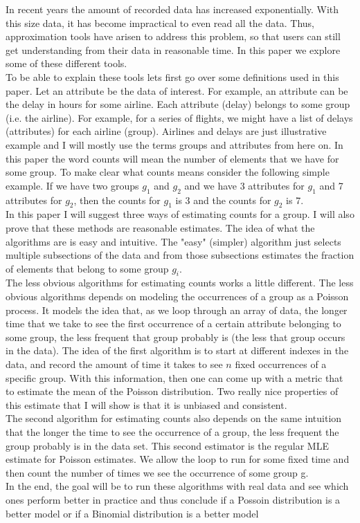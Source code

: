 \documentclass[a4paper]{article}
\begin{document}
In recent years the amount of recorded data has increased exponentially.
With this size data, it has become impractical to even read all the data.
Thus, approximation tools have arisen to address this problem, so that users can still get understanding from their data in reasonable time.
In this paper we explore some of these different tools.\\
\indent To be able to explain these tools lets first go over some definitions used in this paper.
Let an attribute be the data of interest.
For example, an attribute can be the delay in hours for some airline.
Each attribute (delay) belongs to some group (i.e. the airline).
For example, for a series of flights, we might have a list of delays (attributes) for each airline (group).
Airlines and delays are just illustrative example and
I will mostly use the terms groups and attributes from here on.
In this paper the word counts will mean the number of elements that we have for some group.
To make clear what counts means consider the following simple example.
If we have two groups $g_1$ and $g_2$ and we have 3 attributes for $g_1$ and 7 attributes for $g_2$, then the counts for $g_1$ is 3 and the counts for $g_2$ is 7.\\
\indent In this paper I will suggest three ways of estimating counts for a group.
I will also prove that these methods are reasonable estimates.
The idea of what the algorithms are is easy and intuitive.
The "easy" (simpler) algorithm just selects multiple subsections of the data and from those subsections estimates the fraction of elements that belong to some group $g_i$. \\
\indent The less obvious algorithms for estimating counts works a little different.
The less obvious algorithms depends on modeling the occurrences of a group as a Poisson process.
It models the idea that, as we loop through an array of data, the longer time that we take to see the first occurrence of a certain attribute belonging to some group, the less frequent that group probably is (the less that group occurs in the data).
The idea of the first algorithm is to start at different indexes in the data, and record the amount of time it takes to see $n$ fixed occurrences of a specific group.
With this information, then one can come up with a metric that to estimate the mean of the Poisson distribution.
Two really nice properties of this estimate that I will show is that it is unbiased and consistent.\\
\indent The second algorithm for estimating counts also depends on the same intuition that the longer the time to see the occurrence of a group, the less frequent the group probably is in the data set.
This second estimator is the regular MLE estimate for Poisson estimates.
We allow the loop to run for some fixed time and then count the number of times we see the occurrence of some group g. \\
\indent In the end, the goal will be to run these algorithms with real data and see which ones perform better in practice and thus conclude if a Possoin distribution is a better model or if a Binomial distribution is a better model
\end{document}
